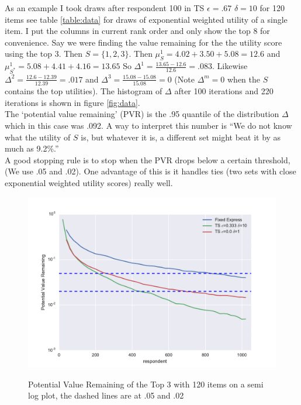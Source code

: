 \documentclass[nonblindrev]{informs3}
\begin{document}
As an example I took draws after respondent 100 in TS $\epsilon=.67$ $\delta=10$ for 120 items see table \ref{table:data} for draws of exponential weighted utility of a single item. I put the columns in current rank order and only show the top 8 for convenience. Say we were finding the value remaining for the the utility score using the top 3. Then $S=\{1,2,3\}$. Then $\mu^1_{S}=4.02+3.50+5.08=12.6$ and $\mu_{S^*}^{1}=5.08+4.41+4.16=13.65$ So $\Delta^{1}=\frac{13.65-12.6}{12.6}=.083$. Likewise $\Delta^{2}=\frac{12.6-12.39}{12.39}=.017$ and $\Delta^{3}=\frac{15.08-15.08}{15.08}=0$ (Note $\Delta^m=0$ when the $S$ contains the top utilities). The histogram of $\Delta$ after 100 iterations and 220 iterations is shown in figure \ref{fig:data}. \\
 The `potential value remaining' (PVR) is the .95 quantile of the distribution $\Delta$ which in this case was .092. A way to interpret this number is ``We do not know what the utility of $S$ is, but whatever it is, a different set might beat it by as much as 9.2\%.''\\
 A good stopping rule is to stop when the PVR drops below a certain threshold, (We use .05 and .02). One advantage of this is it handles ties (two sets with close exponential weighted utility scores) really well. 
\begin{figure}
\caption{Potential Value Remaining of the Top 3 with 120 items on a semi log plot, the dashed lines are at .05 and .02}
\includegraphics[width=1\textwidth]{plots/3vr120show3.pdf}
\label{fig:3vr}
\end{figure}
\end{document}
